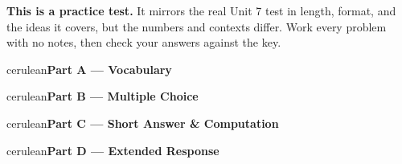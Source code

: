 \documentclass[10pt]{article}
\newcommand{\parthead}[1]{%
  \vspace{6pt}\noindent
  \begin{headlinebox}{cerulean}{\color{white}\bfseries #1}\end{headlinebox}%
  \vspace{4pt}}
\begin{document}
\namedateperiod

\vspace{0.10in}
\begin{remindbox}
\small
\textbf{This is a practice test.} It mirrors the real Unit 7 test in length, format,
and the ideas it covers, but the numbers and contexts differ. Work every problem
with no notes, then check your answers against the key.
\end{remindbox}

\parthead{Part A --- Vocabulary}

\parthead{Part B --- Multiple Choice}

\parthead{Part C --- Short Answer \& Computation}

\parthead{Part D --- Extended Response}
\end{document}
